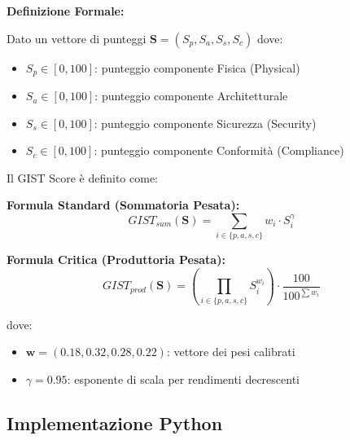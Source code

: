 \textbf{Definizione Formale:}

Dato un vettore di punteggi $\mathbf{S} = (S_p, S_a, S_s, S_c)$ dove:
\begin{itemize}
\item $S_p \in [0,100]$: punteggio componente Fisica (Physical)
\item $S_a \in [0,100]$: punteggio componente Architetturale
\item $S_s \in [0,100]$: punteggio componente Sicurezza (Security)
\item $S_c \in [0,100]$: punteggio componente Conformità (Compliance)
\end{itemize}

Il GIST Score è definito come:

\textbf{Formula Standard (Sommatoria Pesata):}
$$GIST_{sum}(\mathbf{S}) = \sum_{i \in \{p,a,s,c\}} w_i \cdot S_i^{\gamma}$$

\textbf{Formula Critica (Produttoria Pesata):}
$$GIST_{prod}(\mathbf{S}) = \left(\prod_{i \in \{p,a,s,c\}} S_i^{w_i}\right) \cdot \frac{100}{100^{\sum w_i}}$$

dove:
\begin{itemize}
\item $\mathbf{w} = (0.18, 0.32, 0.28, 0.22)$: vettore dei pesi calibrati
\item $\gamma = 0.95$: esponente di scala per rendimenti decrescenti
\end{itemize}

\subsection{\texorpdfstring{Implementazione Python}{C.4.2 - Implementazione Python}}

